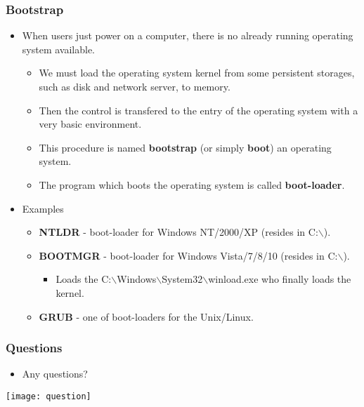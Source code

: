 \documentclass[CJKutf8,dvipsnames,table]{beamer}
\begin{document}
\begin{CJK*}{UTF8}{song}
  \begin{frame}
    \frametitle{Bootstrap} \pause
    \begin{itemize}
    \item When users just power on a computer, there is no already running operating system available.  \pause
      \begin{itemize}
      \item We must load the operating system kernel from some persistent storages, such as disk and network server, to memory.  \pause
      \item Then the control is transfered to the entry of the operating system with a very basic environment.  \pause
      \item This procedure is named \textbf{bootstrap} (or simply \textbf{boot}) an operating system.  \pause
      \item The program which boots the operating system is called \textbf{boot-loader}.  \pause
      \end{itemize}
    \item Examples 
      \begin{itemize}
      \item \textbf{NTLDR} - boot-loader for Windows NT/2000/XP (resides in C:$\backslash$).  \pause
      \item \textbf{BOOTMGR} - boot-loader for Windows Vista/7/8/10 (resides in C:$\backslash$).  \pause
	      \begin{itemize}
          \item Loads the C:$\backslash$Windows$\backslash$System32$\backslash$winload.exe who finally loads the kernel.   \pause
	      \end{itemize}
      \item \textbf{GRUB} - one of boot-loaders for the Unix/Linux.  \pause
      \end{itemize}
    \end{itemize}
  \end{frame}

  \begin{frame}
    \frametitle{Questions}
    \begin{itemize}
    \item Any questions? 
    \end{itemize}
    \begin{center}
      \texttt{[image: question]}
    \end{center}
  \end{frame}


\end{CJK*}
\end{document}
